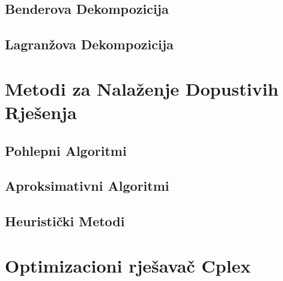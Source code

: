 \documentclass[a4paper, utf8, 11pt, colorlinks]{article}
\begin{document}
 \subsection{Benderova Dekompozicija}
 
  \subsection{Lagranžova Dekompozicija}
 
 \section{Metodi za Nalaženje Dopustivih Rješenja}

\subsection{Pohlepni Algoritmi}

\subsection{Aproksimativni Algoritmi}
  
\subsection{Heuristički Metodi}
 
 \section{Optimizacioni rješavač Cplex}
\end{document}
